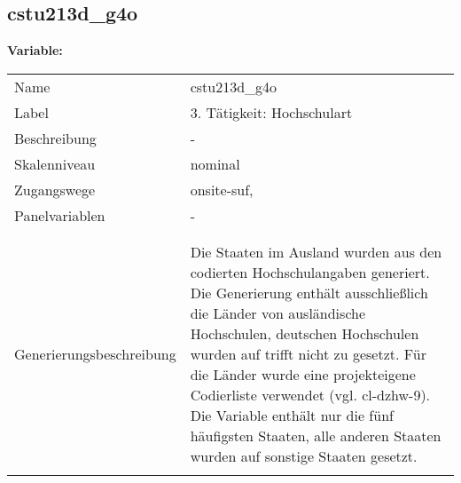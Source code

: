 	
	
	\subsection{cstu213d\_g4o}
	\label{subSection:cstu213d_g4o}

	\noindent\textbf{Variable:}\\
		\begin{tabular}{lL{11.3cm}}
			\label{tableVariable:cstu213d_g4o}
			Name & cstu213d\_g4o \\
			Label & 3. Tätigkeit: Hochschulart \\
			Beschreibung & - \\
			Skalenniveau & nominal \\
			Zugangswege &
				onsite-suf,
 \\
			Panelvariablen & -
			 \\
			 \\
 \\
					Generierungsbeschreibung & Die Staaten im Ausland wurden aus den codierten Hochschulangaben generiert. Die Generierung enthält ausschließlich die Länder von ausländische Hochschulen, deutschen Hochschulen wurden auf trifft nicht zu gesetzt. Für die Länder wurde eine projekteigene Codierliste verwendet (vgl. cl-dzhw-9). Die Variable enthält nur die fünf häufigsten Staaten, alle anderen Staaten wurden auf sonstige Staaten gesetzt. 
				 \\	
			 \\
		\end{tabular}






